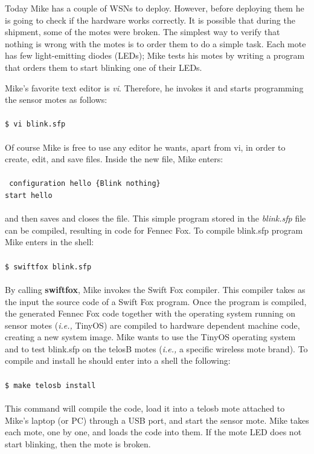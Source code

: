 \documentclass[11pt]{article}
\begin{document}
Today Mike has a couple of WSNs to deploy. However, before deploying them
he is going to check if the hardware works correctly. It is possible that
during the shipment, some of the motes were broken. The simplest way to
verify that nothing is wrong with the motes is to order them to do a simple
task. Each mote has few light-emitting diodes (LEDs); Mike tests his motes 
by writing a program that orders them to start blinking one of their LEDs.

Mike's favorite text editor is \textit{vi}. Therefore, he invokes it and
starts programming the sensor motes as follows:				\\
\\
\texttt{\$ vi blink.sfp}						\\
\\
Of course Mike is free to use any editor he wants, apart from vi, in
order to create, edit, and save files. Inside the new file, Mike enters:\\ 
\\
\texttt{
configuration hello \{Blink nothing\}					\\
start hello								\\
}
\\
and then saves and closes the file. This simple program stored in the
\textit{blink.sfp} file can be compiled, resulting in code for Fennec Fox.
To compile blink.sfp program Mike enters in the shell:			\\
\\
\texttt{\$ swiftfox blink.sfp}						\\
\\
By calling \textbf{swiftfox}, Mike invokes the Swift Fox compiler. This 
compiler takes as the input the source code of a Swift Fox program. Once
the program is compiled, the generated Fennec Fox code together with
the operating system running on sensor motes (\textit{i.e.,} TinyOS) are
compiled to hardware dependent machine code, creating a new system image.
Mike wants to use the TinyOS operating system and to test blink.sfp on the 
telosB motes (\textit{i.e.,} a specific wireless mote brand). To compile
and install he should enter into a shell the following:			\\
\\
\texttt{\$ make telosb install}						\\
\\
This command will compile the code, load it into a telosb mote attached to 
Mike's laptop (or PC) through a USB port, and start the sensor mote. Mike
takes each mote, one by one, and loads the code into them. If the mote LED 
does not start blinking, then the mote is broken.
\end{document}
